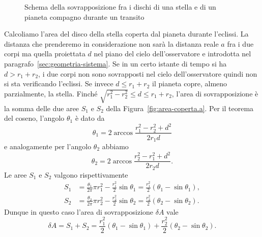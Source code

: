 \begin{figure}
  \centering
   \qquad
  \caption{Schema della sovrapposizione fra i dischi di una stella e di un
    pianeta compagno durante un transito}
  \label{fig:area-coperta}
\end{figure}
Calcoliamo l'area del disco della stella coperta dal pianeta durante
l'eclissi. La distanza che prenderemo in considerazione non sarà la distanza
reale $a$ fra i due corpi ma quella proiettata $d$ nel piano del cielo
dell'osservatore e introdotta nel paragrafo~\ref{sec:geometria-sistema}. Se in
un certo istante di tempo si ha $d > r_1 + r_2$, i due corpi non sono
sovrapposti nel cielo dell'osservatore quindi non si sta verificando
l'eclissi. Se invece $d \leq r_1 + r_2$ il pianeta copre, almeno parzialmente,
la stella. Finché $\sqrt{r_1^2 - r_2^2} \leq d \leq r_1 + r_2$, l'area di
sovrapposizione è la somma delle due aree $S_1$ e $S_2$ della
Figura~\ref{fig:area-coperta.a}. Per il teorema del coseno, l'angolo $\theta_1$
è dato da
\begin{equation}
  \theta_1 = 2 \arccos \frac{r_1^2 - r_2^2 + d^2}{2r_1 d}
\end{equation}
e analogamente per l'angolo $\theta_2$ abbiamo
\begin{equation}
  \label{eq:theta2}
  \theta_2 = 2 \arccos \frac{r_2^2 - r_1^2 + d^2}{2r_2 d}.
\end{equation}
Le aree $S_1$ e $S_2$ valgono rispettivamente
\begin{subequations}
  \begin{align}
    S_1 &= \frac{\theta_1}{2\pi}\pi r_1^2 - \frac{r_1^2}{2}\sin\theta_1 =
    \frac{r_1^2}{2}(\theta_1 - \sin\theta_1), \\
    S_2 &= \frac{\theta_2}{2\pi}\pi r_2^2 - \frac{r_2^2}{2}\sin\theta_2 =
    \frac{r_2^2}{2}(\theta_2 - \sin\theta_2).
  \end{align}
\end{subequations}
Dunque in questo caso l'area di sovrapposizione $\delta A$ vale
\begin{equation}
  \delta A = S_1 + S_2 = \frac{r_1^2}{2}(\theta_1 - \sin\theta_1) +
  \frac{r_2^2}{2}(\theta_2 - \sin\theta_2).
\end{equation}
